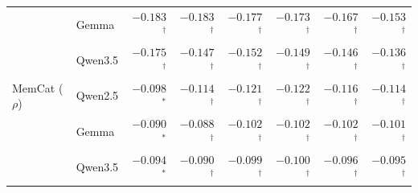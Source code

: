 \begin{table}[t]
\begin{tabular}{@{}llrrrrrr@{}}
 & Gemma & $-0.183$$^{\dagger}$ & $-0.183$$^{\dagger}$ & $-0.177$$^{\dagger}$ & $-0.173$$^{\dagger}$ & $-0.167$$^{\dagger}$ & $-0.153$$^{\dagger}$ \\
 & Qwen3.5 & $-0.175$$^{\dagger}$ & $-0.147$$^{\dagger}$ & $-0.152$$^{\dagger}$ & $-0.149$$^{\dagger}$ & $-0.146$$^{\dagger}$ & $-0.136$$^{\dagger}$ \\
\addlinespace
MemCat ($\rho$) & Qwen2.5 & $-0.098$$^{*}$ & $-0.114$$^{\dagger}$ & $-0.121$$^{\dagger}$ & $-0.122$$^{\dagger}$ & $-0.116$$^{\dagger}$ & $-0.114$$^{\dagger}$ \\
 & Gemma & $-0.090$$^{*}$ & $-0.088$$^{\dagger}$ & $-0.102$$^{\dagger}$ & $-0.102$$^{\dagger}$ & $-0.102$$^{\dagger}$ & $-0.101$$^{\dagger}$ \\
 & Qwen3.5 & $-0.094$$^{*}$ & $-0.090$$^{\dagger}$ & $-0.099$$^{\dagger}$ & $-0.100$$^{\dagger}$ & $-0.096$$^{\dagger}$ & $-0.095$$^{\dagger}$ \\
\bottomrule
\end{tabular}
\end{table}
